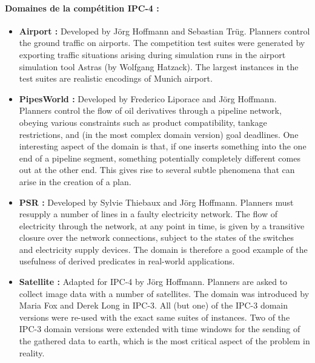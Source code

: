 \paragraph*{Domaines de la compétition IPC-4 :}
\begin{itemize}
\item \textbf{Airport :}
{\color{red}Developed by Jörg Hoffmann and Sebastian Trüg. Planners control the ground traffic on airports. The competition test suites were generated by exporting traffic situations arising during simulation runs in the airport simulation tool Astras (by Wolfgang Hatzack). The largest instances in the test suites are realistic encodings of Munich airport.}
\item \textbf{PipesWorld :}
{\color{red}Developed by Frederico Liporace and Jörg Hoffmann. Planners control the flow of oil derivatives through a pipeline network, obeying various constraints such as product compatibility, tankage restrictions, and (in the most complex domain version) goal deadlines. One interesting aspect of the domain is that, if one inserts something into the one end of a pipeline segment, something potentially completely different comes out at the other end. This gives rise to several subtle phenomena that can arise in the creation of a plan.}
\item \textbf{PSR :}
{\color{red}Developed by Sylvie Thiebaux and Jörg Hoffmann. Planners must resupply a number of lines in a faulty electricity network. The flow of electricity through the network, at any point in time, is given by a transitive closure over the network connections, subject to the states of the switches and electricity supply devices. The domain is therefore a good example of the usefulness of derived predicates in real-world applications.}
\item \textbf{Satellite :}
{\color{red}Adapted for IPC-4 by Jörg Hoffmann. Planners are asked to collect image data with a number of satellites. The domain was introduced by Maria Fox and Derek Long in IPC-3. All (but one) of the IPC-3 domain versions were re-used with the exact same suites of instances. Two of the IPC-3 domain versions were extended with time windows for the sending of the gathered data to earth, which is the most critical aspect of the problem in reality.}
\end{itemize}

